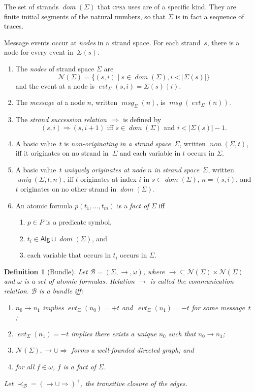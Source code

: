 \documentclass[12pt]{article}
\newcommand{\cpsa}{\textsc{cpsa}}
\newcommand{\fn}[1]{\ensuremath{\operatorname{\mathit{#1}}}}
\newcommand{\sdom}{\fn{dom}}
\newcommand{\inbnd}{\mathord -}
\newcommand{\outbnd}{\mathord +}
\newcommand{\nodes}{\ensuremath{\mathcal{N}}}
\newcommand{\evt}{\fn{evt}}
\newcommand{\length}[1]{\ensuremath{|#1|}}
\newcommand{\bun}{\ensuremath{\mathcal{B}}}
\newcommand{\alg}[1]{\ensuremath{\mathsf{#1}}}
\newcommand{\msg}{\alg{Alg}}
\newcommand{\atom}{basic value}
\newcommand{\Indefart}{A}
\newcommand{\ssp}{\Sigma}
\newcommand{\strands}{\sdom}
\newcommand{\mess}{\fn{msg}}
\newcounter{running}[section]
\newenvironment{renumerate}{\begin{enumerate}%
\setcounter{enumi}{\value{running}}}%
{\setcounter{running}{\value{enumi}}\end{enumerate}}
\newtheorem{definition}{Definition}
\begin{document}
The set of strands $\sdom(\ssp)$ that {\cpsa} uses are of a specific
kind.  They are finite initial segments of the natural numbers, so
that $\ssp$ is in fact a sequence of traces.

%
Message events occur at \emph{nodes} in a strand space.  For each
strand~$s$, there is a node for every event in~$\ssp(s)$.
\begin{renumerate}
  \item The \emph{nodes} of strand space $\ssp$ are
%
  $$ \nodes(\ssp)=\{(s,i)\mid
  s\in\strands(\ssp), i < \length{\ssp(s)}\}
  $$
  and the event at a node is $\evt_{\ssp}(s,i)=\ssp(s)(i)$.
  \item The \emph{message at} a node $n$, written $\mess_{\ssp}(n)$,
    is $\mess(\evt_{\ssp}(n))$.
  \item The \emph{strand succession relation}~$\Rightarrow$ is defined
  by
%
  $$(s,i)\Rightarrow(s,i+1)\mbox{ iff } s\in\strands(\ssp)\mbox{ and }
  i<\length{\ssp(s)}-1.$$
%
  \item {\Indefart} {\atom}~$t$ is \emph{non-originating} \emph{in a
    strand space}~$\ssp$, written $\fn{non}(\ssp,t)$, iff it
    originates on no strand in~$\ssp$ and each variable in $t$ occurs
    in $\ssp$.
  \item {\Indefart} {\atom}~$t$ \emph{uniquely originates at node} $n$
    \emph{in strand space}~$\ssp$, written $\fn{uniq}(\ssp,t,n)$,
    iff $t$ originates at index $i$ in $s\in\sdom(\ssp)$, $n=(s,i)$,
    and $t$ originates on no other strand in $\sdom(\ssp)$.
  \item An atomic formula $p(t_1,\ldots,t_m)$ is a
    \emph{fact of} $\ssp$ iff
    \begin{enumerate}
    \item $p\in P$ is a predicate symbol,
    \item $t_i\in\msg\cup\sdom(\ssp)$, and
    \item each variable that occurs in $t_i$ occurs in $\ssp$.
    \end{enumerate}
\end{renumerate}

\begin{definition}[Bundle]\label{def:bundle} Let $\bun=(\ssp,\to,\omega)$, where
  $\to\subseteq\nodes(\ssp)\times\nodes(\ssp)$ and $\omega$ is a set
  of atomic formulas.  Relation $\to$ is called the
  \emph{communication relation}.  $\bun$ is a \emph{bundle} iff:
  \begin{enumerate}
    \item $n_0\to n_1$ implies $\evt_{\ssp}(n_0)=\outbnd t$
    and~$\evt_{\ssp}(n_1)=\inbnd t$ for some message~$t$;
    \item $\evt_{\ssp}(n_1)=\inbnd t$ implies there exists a unique
      $n_0$ such that $n_0\to n_1$;
    \item $\nodes(\ssp),\to\cup\Rightarrow$ forms a well-founded
      directed graph; and
    \item for all $f\in\omega$, $f$ is a fact of $\ssp$.
  \end{enumerate}
  Let $\prec_{\bun}=(\to\cup\Rightarrow)^+$, the transitive closure of
  the edges.
%
\end{definition}
\end{document}
